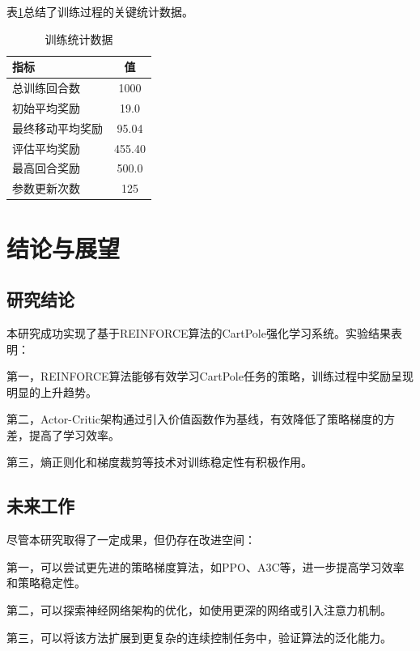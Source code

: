 \documentclass[12pt,a4paper]{article}
\begin{document}
表\ref{tab:training_stats}总结了训练过程的关键统计数据。

\begin{table}[H]
\centering
\caption{训练统计数据}
\label{tab:training_stats}
\begin{tabular}{lc}
\toprule
\textbf{指标} & \textbf{值} \\
\midrule
总训练回合数 & 1000 \\
初始平均奖励 & 19.0 \\
最终移动平均奖励 & 95.04 \\
评估平均奖励 & 455.40 \\
最高回合奖励 & 500.0 \\
参数更新次数 & 125 \\
\bottomrule
\end{tabular}
\end{table}

\section{结论与展望}

\subsection{研究结论}

本研究成功实现了基于REINFORCE算法的CartPole强化学习系统。实验结果表明：

第一，REINFORCE算法能够有效学习CartPole任务的策略，训练过程中奖励呈现明显的上升趋势。

第二，Actor-Critic架构通过引入价值函数作为基线，有效降低了策略梯度的方差，提高了学习效率。

第三，熵正则化和梯度裁剪等技术对训练稳定性有积极作用。

\subsection{未来工作}

尽管本研究取得了一定成果，但仍存在改进空间：

第一，可以尝试更先进的策略梯度算法，如PPO、A3C等，进一步提高学习效率和策略稳定性。

第二，可以探索神经网络架构的优化，如使用更深的网络或引入注意力机制。

第三，可以将该方法扩展到更复杂的连续控制任务中，验证算法的泛化能力。
\end{document}
